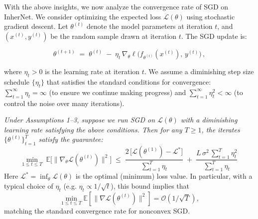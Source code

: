 \documentclass{article} %
\begin{document}
With the above insights, we now analyze the convergence rate of SGD on InherNet. We consider optimizing the expected loss $\mathcal{L}(\theta)$ using stochastic gradient descent. Let $\theta^{(t)}$ denote the model parameters at iteration $t$, and $(x^{(t)}, y^{(t)})$ be the random sample drawn at iteration $t$. The SGD update is:

\begin{equation}
\theta^{(t+1)} \;=\; \theta^{(t)} \;-\; \eta_t\, \nabla_{\!\theta}\ell\!\big(f_{\theta^{(t)}}(x^{(t)}),\,y^{(t)}\big)\,,
\end{equation}

where $\eta_t > 0$ is the learning rate at iteration $t$. We assume a diminishing step size schedule $\{\eta_t\}$ that satisfies the standard conditions for convergence: $\sum_{t=1}^{\infty} \eta_t = \infty$ (to ensure we continue making progress) and $\sum_{t=1}^{\infty} \eta_t^2 < \infty$ (to control the noise over many iterations).

\begin{theorem}
\textit{Under Assumptions 1–3, suppose we run SGD on $\mathcal{L}(\theta)$ with a diminishing learning rate satisfying the above conditions. Then for any $T \ge 1$, the iterates $\{\theta^{(t)}\}_{t=1}^T$ satisfy the guarantee:} 
\begin{equation}
\min_{1 \le t \le T}\;\mathbb{E}\Big[\big\|\nabla_{\!\theta}\mathcal{L}(\theta^{(t)})\big\|^2\Big] \;\le\; \frac{2\,\big[\mathcal{L}(\theta^{(1)}) - \mathcal{L}^*\big]}{\sum_{t=1}^{T}\eta_t} \;+\; \frac{L\,\sigma^2\,\sum_{t=1}^{T}\eta_t^2}{\sum_{t=1}^{T}\eta_t}\,
\end{equation}
Here $\mathcal{L}^* = \inf_{\theta} \mathcal{L}(\theta)$ is the optimal (minimum) loss value. In particular, with a typical choice of $\eta_t$ (e.g. $\eta_t \propto 1/\sqrt{t}$), this bound implies that 
\begin{equation}
\min_{1 \le t \le T} \mathbb{E}[\|\nabla \mathcal{L}(\theta^{(t)})\|^2] = \mathcal{O}(1/\sqrt{T}),
\end{equation}
matching the standard convergence rate for nonconvex SGD.
\end{theorem}
\end{document}
